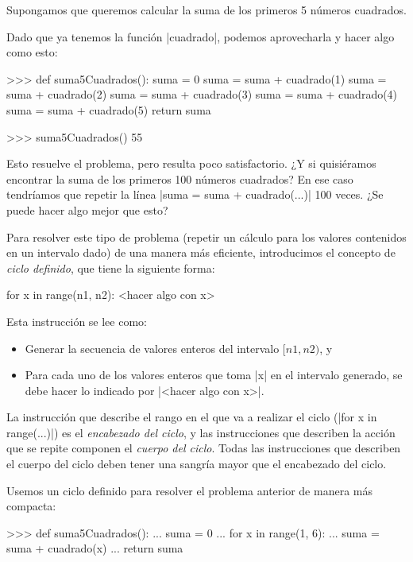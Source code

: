 \begin{problema}
Supongamos que queremos calcular la suma de los primeros 5 números cuadrados.

\begin{solucion}
Dado que ya tenemos la función |cuadrado|, podemos aprovecharla y hacer algo
como esto:

\begin{codigo-python-sn}
>>> def suma5Cuadrados():
	suma = 0
	suma = suma + cuadrado(1)
	suma = suma + cuadrado(2)
	suma = suma + cuadrado(3)
	suma = suma + cuadrado(4)
	suma = suma + cuadrado(5)
	return suma

>>> suma5Cuadrados()
55
\end{codigo-python-sn}
\end{solucion}

Esto resuelve el problema, pero resulta poco satisfactorio. ¿Y si quisiéramos
encontrar la suma de los primeros 100 números cuadrados? En ese caso tendríamos
que repetir la línea |suma = suma + cuadrado(...)| 100 veces. ¿Se puede hacer
algo mejor que esto?

Para resolver este tipo de problema (repetir un cálculo para los valores
contenidos en un intervalo dado) de una manera más eficiente, introducimos el
concepto de {\it ciclo definido}, que tiene la siguiente forma:

\begin{codigo-python-sn}
for x in range(n1, n2):
    <hacer algo con x>
\end{codigo-python-sn}

Esta instrucción se lee como:

\begin{itemize}
\item Generar la secuencia de valores enteros del intervalo $[n1, n2)$, y
\item Para cada uno de los valores enteros que toma |x| en el intervalo generado,
se debe hacer lo indicado por |<hacer algo con x>|.
\end{itemize}

La instrucción que describe el rango en el que va a realizar el ciclo
(|for x in range(...)|) es el {\it encabezado del ciclo}, y las instrucciones
que describen la acción que se repite componen el {\it cuerpo del ciclo}.
Todas las instrucciones que describen el cuerpo del ciclo deben tener una
sangría mayor que el encabezado del ciclo.

\begin{solucion}
Usemos un ciclo definido para resolver el problema anterior de manera más
compacta:

\begin{codigo-python-sn}
>>> def suma5Cuadrados():
...     suma = 0
...     for x in range(1, 6):
...         suma = suma + cuadrado(x)
...     return suma
\end{codigo-python-sn}
\end{solucion}
\end{problema}

